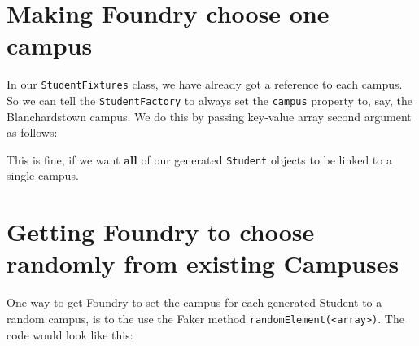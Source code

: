 \documentclass[a4paperpaper,openright]{book}
\newenvironment{Shaded}{}{}
\newcommand{\DecValTok}[1]{\textcolor[rgb]{0.25,0.63,0.44}{#1}}
\newcommand{\KeywordTok}[1]{\textcolor[rgb]{0.00,0.44,0.13}{\textbf{#1}}}
\newcommand{\NormalTok}[1]{#1}
\newcommand{\OtherTok}[1]{\textcolor[rgb]{0.00,0.44,0.13}{#1}}
\newcommand{\StringTok}[1]{\textcolor[rgb]{0.25,0.44,0.63}{#1}}
\begin{document}
\hypertarget{making-foundry-choose-one-campus}{%
\section{Making Foundry choose one
campus}\label{making-foundry-choose-one-campus}}

In our \texttt{StudentFixtures} class, we have already got a reference
to each campus. So we can tell the \texttt{StudentFactory} to always set
the \texttt{campus} property to, say, the Blanchardstown campus. We do
this by passing key-value array second argument as follows:

\begin{Shaded}
\end{Shaded}

This is fine, if we want \textbf{all} of our generated \texttt{Student}
objects to be linked to a single campus.

\hypertarget{getting-foundry-to-choose-randomly-from-existing-campuses}{%
\section{Getting Foundry to choose randomly from existing
Campuses}\label{getting-foundry-to-choose-randomly-from-existing-campuses}}

One way to get Foundry to set the campus for each generated Student to a
random campus, is to the use the Faker method
\texttt{randomElement(\textless{}array\textgreater{})}. The code would
look like this:
\end{document}
